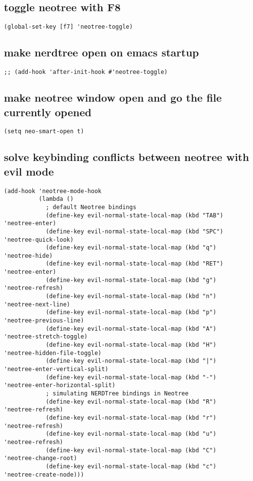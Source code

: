 \documentclass[11pt]{article}
\begin{document}
\subsection*{toggle neotree with F8}
\label{sec:orga2d7a9b}
\begin{verbatim}
(global-set-key [f7] 'neotree-toggle)
\end{verbatim}


\subsection*{make nerdtree open on emacs startup}
\label{sec:org92ad762}
\begin{verbatim}
;; (add-hook 'after-init-hook #'neotree-toggle)
\end{verbatim}




\subsection*{make neotree window open and go the file currently opened}
\label{sec:orgdb77e4d}
\begin{verbatim}
(setq neo-smart-open t)
\end{verbatim}


\subsection*{solve keybinding conflicts between neotree with evil mode}
\label{sec:orge35949f}
\begin{verbatim}
(add-hook 'neotree-mode-hook
          (lambda ()
            ; default Neotree bindings
            (define-key evil-normal-state-local-map (kbd "TAB") 'neotree-enter)
            (define-key evil-normal-state-local-map (kbd "SPC") 'neotree-quick-look)
            (define-key evil-normal-state-local-map (kbd "q") 'neotree-hide)
            (define-key evil-normal-state-local-map (kbd "RET") 'neotree-enter)
            (define-key evil-normal-state-local-map (kbd "g") 'neotree-refresh)
            (define-key evil-normal-state-local-map (kbd "n") 'neotree-next-line)
            (define-key evil-normal-state-local-map (kbd "p") 'neotree-previous-line)
            (define-key evil-normal-state-local-map (kbd "A") 'neotree-stretch-toggle)
            (define-key evil-normal-state-local-map (kbd "H") 'neotree-hidden-file-toggle)
            (define-key evil-normal-state-local-map (kbd "|") 'neotree-enter-vertical-split)
            (define-key evil-normal-state-local-map (kbd "-") 'neotree-enter-horizontal-split)
            ; simulating NERDTree bindings in Neotree
            (define-key evil-normal-state-local-map (kbd "R") 'neotree-refresh)
            (define-key evil-normal-state-local-map (kbd "r") 'neotree-refresh)
            (define-key evil-normal-state-local-map (kbd "u") 'neotree-refresh)
            (define-key evil-normal-state-local-map (kbd "C") 'neotree-change-root)
            (define-key evil-normal-state-local-map (kbd "c") 'neotree-create-node)))
\end{verbatim}
\end{document}
